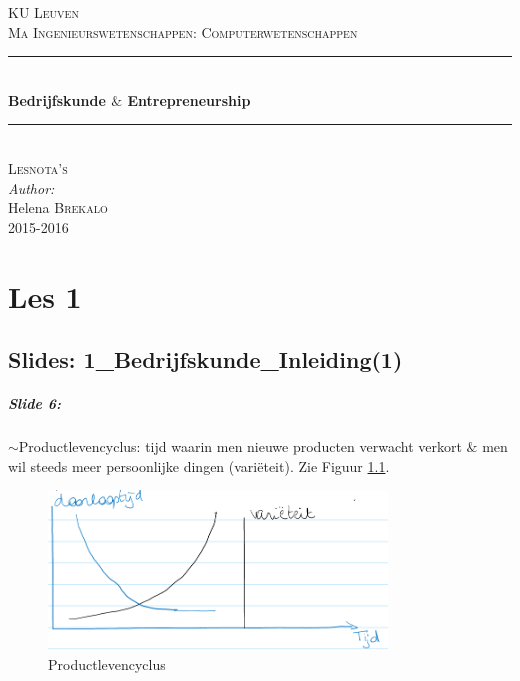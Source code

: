 \documentclass[10pt,a4paper]{report}
\author{Helena Brekalo}
\begin{document}
\begin{titlepage}

\newcommand{\HRule}{\rule{\linewidth}{0.5mm}} %

\center %
 
\textsc{\LARGE KU Leuven}\\[1.5cm] %
\textsc{\Large Ma Ingenieurswetenschappen: Computerwetenschappen}\\[0.5cm] %


\HRule \\[0.4cm]
{ \huge \bfseries Bedrijfskunde $\&$ Entrepreneurship}\\[0.4cm]
\HRule \\[1.5cm]


\textsc{\large Lesnota's}\\[0.5cm] %


\Large \emph{Author:}\\
Helena \textsc{Brekalo}\\[3cm]

{\large 2015-2016}\\[3cm] %

\vfill %

\end{titlepage}

\tableofcontents
\clearpage

\chapter{Les 1}

\section{Slides: 1\_Bedrijfskunde\_Inleiding(1)}

\paragraph{Slide 6:} $\sim$Productlevencyclus: tijd waarin men nieuwe producten verwacht verkort $\&$ men wil steeds meer persoonlijke dingen (vari\"eteit). Zie Figuur \ref{les01_01}.

\begin{figure}[h!]
\centering
\includegraphics[width=90mm]{Les01_01.png}
\caption{Productlevencyclus} 
\label{les01_01}
\end{figure}
\end{document}
